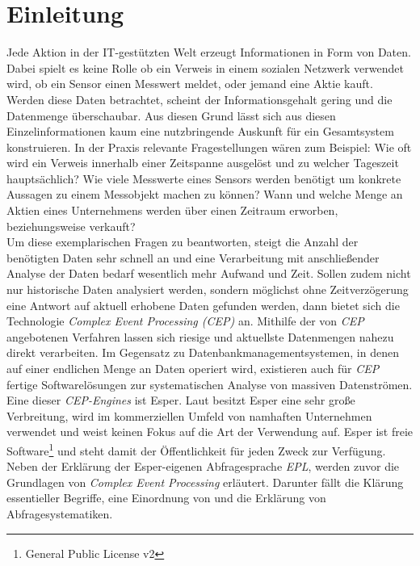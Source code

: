 \documentclass{acm_proc_article-sp}
\begin{document}
\section{Einleitung}
\vspace{0.1cm}
Jede Aktion in der IT-gestützten Welt erzeugt 
Informationen in Form von Daten. Dabei spielt es keine Rolle ob ein Verweis in einem 
sozialen Netzwerk verwendet wird, ob ein Sensor einen Messwert meldet, oder jemand eine 
Aktie kauft. Werden diese Daten betrachtet, scheint der Informationsgehalt gering und die 
Datenmenge überschaubar. Aus diesen Grund lässt sich aus diesen Einzelinformationen kaum 
eine nutzbringende Auskunft für ein Gesamtsystem konstruieren. In der Praxis relevante
Fragestellungen wären zum Beispiel: Wie oft wird ein Verweis innerhalb einer Zeitspanne 
ausgelöst und zu welcher Tageszeit hauptsächlich? Wie viele Messwerte eines Sensors 
werden benötigt um konkrete Aussagen zu einem Messobjekt machen zu können? Wann und 
welche Menge an Aktien eines Unternehmens werden über einen Zeitraum erworben, 
beziehungsweise verkauft?\\
Um diese exemplarischen Fragen zu beantworten, steigt die Anzahl der benötigten Daten 
sehr schnell an und eine Verarbeitung mit anschließender Analyse der Daten bedarf 
wesentlich mehr Aufwand und Zeit.
Sollen zudem nicht nur historische Daten analysiert werden, sondern 
möglichst ohne Zeitverzögerung eine Antwort auf aktuell erhobene Daten gefunden werden, 
dann 
bietet sich die Technologie \textit{Complex Event Processing (CEP)} an. Mithilfe der von 
\textit{CEP} angebotenen Verfahren lassen sich riesige und aktuellste Datenmengen nahezu 
direkt verarbeiten. Im Gegensatz zu Datenbankmanagementsystemen, in denen auf einer 
endlichen Menge an Daten operiert wird, existieren auch für \textit{CEP} fertige 
Softwarelösungen zur systematischen Analyse von massiven Datenströmen. Eine dieser 
\textit{CEP-Engines} ist Esper. Laut \cite{fraunhofer} besitzt Esper eine 
sehr große Verbreitung, wird im kommerziellen Umfeld von namhaften Unternehmen 
verwendet und weist keinen Fokus auf die Art der Verwendung auf. Esper ist 
freie Software\footnote{General Public License v2} und steht damit der Öffentlichkeit für 
jeden Zweck zur Verfügung.\\
Neben der Erklärung der Esper-eigenen Abfragesprache \textit{EPL}, werden zuvor die 
Grundlagen von \textit{Complex Event Processing} erläutert. Darunter fällt die Klärung 
essentieller Begriffe, eine Einordnung von  und die Erklärung von 
Abfragesystematiken.
\end{document}
